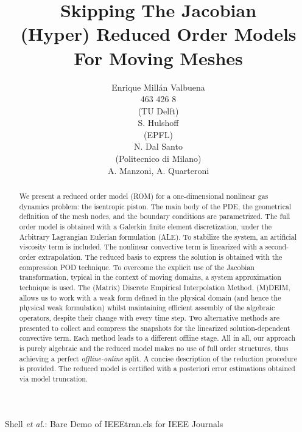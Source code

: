 \documentclass[a4paper, technote,compsoc]{IEEEtran}
\begin{document}
\onecolumn

\title{Skipping The Jacobian \\[5mm] \large{(Hyper) Reduced Order Models For Moving Meshes}}

\author{Enrique Millán Valbuena \\ \normalsize{463 426 8}
\\[5mm]
(TU Delft) 
\\[2mm]
S. Hulshoff 
\\[5mm]
(EPFL) 
\\[2mm]
N. Dal Santo
\\[5mm]
(Politecnico di Milano) 
\\[2mm]
A. Manzoni, A. Quarteroni
}%
        
{Shell \MakeLowercase{\textit{et al.}}: Bare Demo of IEEEtran.cls for IEEE Journals}

\maketitle

\begin{abstract}
   We present a reduced order model (ROM) for a one-dimensional nonlinear gas dynamics problem:
   the isentropic piston.
   The main body of the PDE, 
   the geometrical definition of the mesh nodes, 
   and the boundary conditions are parametrized.
   The full order model is obtained with a Galerkin finite element discretization,
   under the Arbitrary Lagrangian Eulerian formulation (ALE).
   To stabilize the system, an artificial viscosity term is included.
   The nonlinear convective term is linearized with a second-order extrapolation.
   The reduced basis to express the solution is obtained with the compression POD technique.
   To overcome the explicit use of the Jacobian transformation, 
   typical in the context of moving domains,
   a system approximation technique is used.
   The (Matrix) Discrete Empirical Interpolation Method, (M)DEIM, allows us
   to work with a weak form defined in the physical domain 
   (and hence the physical weak formulation)
   whilst maintaining efficient assembly of the algebraic operators, 
   despite their change with every time step.
   Two alternative methods are presented to collect and compress the snapshots 
   for the linearized solution-dependent convective term.
   Each method leads to a different offline stage.
   All in all, our approach is purely algebraic
   and the reduced model makes no use of full order structures, 
   thus achieving a perfect \textit{offline-online} split.
   A concise description of the reduction procedure is provided.
   The reduced model is certified with a posteriori error estimations obtained via model truncation.
\end{abstract}
\end{document}
